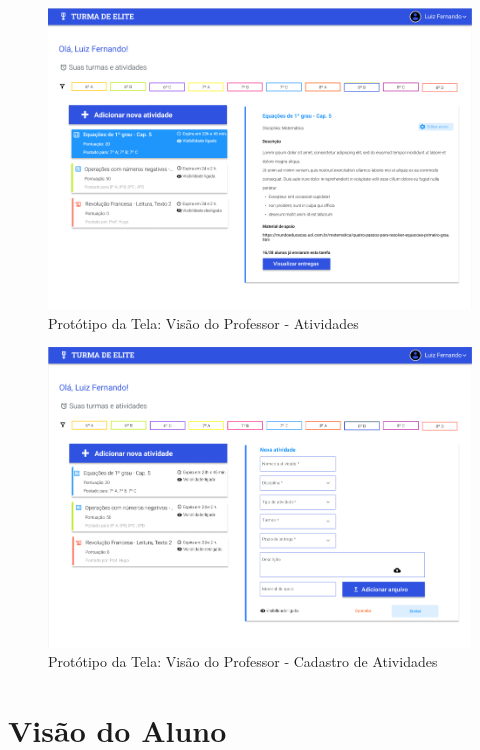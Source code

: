 \begin{apendicesenv}
\begin{figure}[htb]
    \centering
	\includegraphics[width=16cm]{imagens/Professor-Atividades.png}
	\caption{\label{fig:atividades} Protótipo da Tela: Visão do Professor - Atividades}
\end{figure}
\FloatBarrier

\begin{figure}[htb]
    \centering
	\includegraphics[width=16cm]{imagens/Professor-CadastroAtividades.png}
	\caption{\label{fig:professor} Protótipo da Tela: Visão do Professor - Cadastro de Atividades}
\end{figure}
\FloatBarrier


\section{Visão do Aluno}


\end{apendicesenv}
